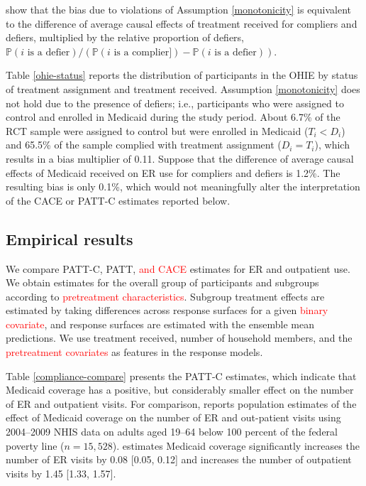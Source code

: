 \documentclass[hidelinks,12pt]{article}
\newcommand{\pr}{\mathbb{P}} %
\begin{document}
\citet{Angrist1996} show that the bias due to violations of Assumption \eqref{monotonicity} is equivalent to the difference of average causal effects of treatment received for compliers and defiers, multiplied by the relative proportion of defiers, 
$\pr(i\text{ is a defier}) / (\pr(i\text{ is a complier]}) - \pr(i\text{ is a defier})).$

Table \ref{ohie-status} reports the distribution of participants in the OHIE by status of treatment assignment and treatment received. Assumption \eqref{monotonicity} does not hold due to the presence of defiers; i.e., participants who were assigned to control and enrolled in Medicaid during the study period. About 6.7\% of the RCT sample were assigned to control but were enrolled in Medicaid ($T_i < D_i$) and 65.5\% of the sample complied with treatment assignment ($D_i = T_i$), which results in a bias multiplier of 0.11. Suppose that the difference of average causal effects of Medicaid received on ER use for compliers and defiers is 1.2\%. The resulting bias is only 0.1\%, which would not meaningfully alter the interpretation of the CACE or PATT-C estimates reported below. 
 
\subsection{Empirical results}\label{results}

We compare PATT-C, PATT, \textcolor{red}{and CACE} estimates for ER and outpatient use. We obtain estimates for the overall group of participants and subgroups according to \textcolor{red}{pretreatment characteristics}. Subgroup treatment effects are estimated by taking differences across response surfaces for a given \textcolor{red}{binary covariate}, and response surfaces are estimated with the ensemble mean predictions. We use treatment received, number of household members, and the \textcolor{red}{pretreatment covariates} as features in the response models.

Table \ref{compliance-compare} presents the PATT-C estimates, which indicate that Medicaid coverage has a positive, but considerably smaller effect on the number of ER and outpatient visits. For comparison, \citet{finkelstein2012} reports population estimates of the effect of Medicaid coverage on the number of ER and out-patient visits using 2004--2009 NHIS data on adults aged 19--64 below 100 percent of the federal poverty line ($n=15,528$). \citet{finkelstein2012} estimates Medicaid coverage significantly increases the number of ER visits by 0.08 [0.05, 0.12] and increases the number of outpatient visits by 1.45 [1.33, 1.57]. 
\end{document}
